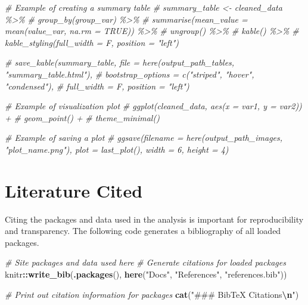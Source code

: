 \documentclass[
]{article}
\newenvironment{Shaded}{\begin{snugshade}}{\end{snugshade}}
\newcommand{\CommentTok}[1]{\textcolor[rgb]{0.56,0.35,0.01}{\textit{#1}}}
\newcommand{\FunctionTok}[1]{\textcolor[rgb]{0.13,0.29,0.53}{\textbf{#1}}}
\newcommand{\NormalTok}[1]{#1}
\newcommand{\SpecialCharTok}[1]{\textcolor[rgb]{0.81,0.36,0.00}{\textbf{#1}}}
\newcommand{\StringTok}[1]{\textcolor[rgb]{0.31,0.60,0.02}{#1}}
\begin{document}
\begin{Shaded}
\begin{Highlighting}[]
\CommentTok{\# Example of creating a summary table }
\CommentTok{\# summary\_table \textless{}{-} cleaned\_data \%\textgreater{}\%}
\CommentTok{\#   group\_by(group\_var) \%\textgreater{}\%}
\CommentTok{\#   summarise(mean\_value = mean(value\_var, na.rm = TRUE)) \%\textgreater{}\%}
\CommentTok{\#   ungroup() \%\textgreater{}\%}
\CommentTok{\#   kable() \%\textgreater{}\%}
\CommentTok{\#   kable\_styling(full\_width = F, position = "left") }

\CommentTok{\# save\_kable(summary\_table, file = here(output\_path\_tables, "summary\_table.html"),}
\CommentTok{\#   bootstrap\_options = c("striped", "hover", "condensed"),}
\CommentTok{\#   full\_width = F, position = "left")}
\end{Highlighting}
\end{Shaded}

\begin{Shaded}
\begin{Highlighting}[]
\CommentTok{\# Example of visualization plot}
\CommentTok{\# ggplot(cleaned\_data, aes(x = var1, y = var2)) +}
\CommentTok{\#   geom\_point() +}
\CommentTok{\#   theme\_minimal()}

\CommentTok{\# Example of saving a plot}
\CommentTok{\# ggsave(filename = here(output\_path\_images, "plot\_name.png"), plot = last\_plot(), width = 6, height = 4)}
\end{Highlighting}
\end{Shaded}

\section{Literature Cited}\label{literature-cited}

Citing the packages and data used in the analysis is important for
reproducibility and transparency. The following code generates a
bibliography of all loaded packages.

\begin{Shaded}
\begin{Highlighting}[]
\CommentTok{\# Site packages and data used here }
\CommentTok{\# Generate citations for loaded packages}
\NormalTok{knitr}\SpecialCharTok{::}\FunctionTok{write\_bib}\NormalTok{(}\FunctionTok{.packages}\NormalTok{(), }\FunctionTok{here}\NormalTok{(}\StringTok{"Docs"}\NormalTok{, }\StringTok{"References"}\NormalTok{, }\StringTok{"references.bib"}\NormalTok{))}

\CommentTok{\# Print out citation information for packages}
\FunctionTok{cat}\NormalTok{(}\StringTok{"\#\#\# BibTeX Citations}\SpecialCharTok{\textbackslash{}n}\StringTok{"}\NormalTok{)}
\end{Highlighting}
\end{Shaded}
\end{document}
